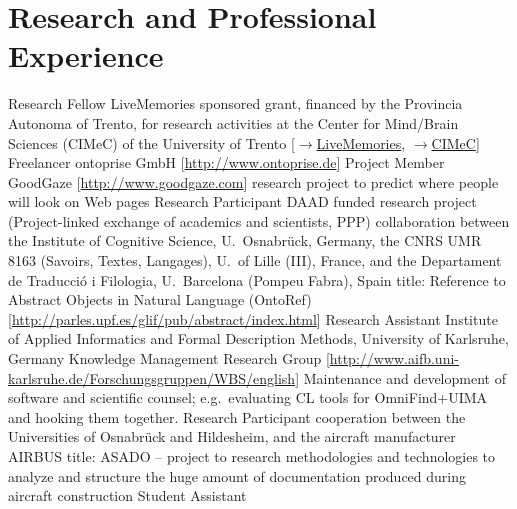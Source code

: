 \documentclass[11pt,a4paper]{moderncv}
\begin{document}
\pagebreak

\section{Research and Professional Experience}
        {Research Fellow}
        {LiveMemories sponsored grant, financed by the Provincia Autonoma of Trento, for research activities at the Center for Mind/Brain Sciences (CIMeC) of the University of Trento [\href{http://www.livememories.org}{$\rightarrow$LiveMemories}, \href{http://www.cimec.unitn.it}{$\rightarrow$CIMeC}]}
        {}{}{}
        {Freelancer}
        {ontoprise GmbH [\url{http://www.ontoprise.de}]}
        {}{}{}
        {Project Member}
        {GoodGaze [\url{http://www.goodgaze.com}]}
        {\small research project to predict where people will look on Web pages}
        {}{}
        {Research Participant}
        {DAAD funded research project (Project-linked exchange of academics and scientists, PPP)}
        {\small collaboration between the Institute of Cognitive Science, U.~Osnabr\"{u}ck, Germany, the CNRS UMR 8163 (Savoirs, Textes, Langages), U.~of Lille (III), France, and the Departament de Traducci\'{o} i Filologia, U.~Barcelona (Pompeu Fabra), Spain}
        {\small title: Reference to Abstract Objects in Natural Language (OntoRef) [\url{http://parles.upf.es/glif/pub/abstract/index.html}]}
        {}
        {Research Assistant}
        {Institute of Applied Informatics and Formal Description Methods, University of Karlsruhe, Germany}
        {\small Knowledge Management Research Group}
        {[\url{http://www.aifb.uni-karlsruhe.de/Forschungsgruppen/WBS/english}]}
        {Maintenance and development of software and scientific counsel; e.g.~evaluating CL tools for OmniFind+UIMA and hooking them together.}
        {Research Participant}
        {cooperation between the Universities of Osnabr\"{u}ck and Hildesheim, and the aircraft manufacturer AIRBUS}
        {\small title: ASADO -- project to research methodologies and technologies to analyze and structure the huge amount of documentation produced during aircraft construction}
        {}{}
        {Student Assistant}
\end{document}
